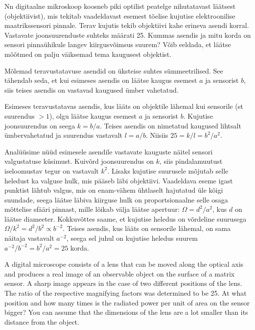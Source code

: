 
Nn digitaalne mikroskoop koosneb piki optilist peatelge nihutatavast
läätsest (objektiivist), mis tekitab vaadeldavast esemest tõelise kujutise
elektroonilise maatrikssensori pinnale. Terav kujutis tekib objektiivi kahe
erineva asendi korral. Vastavate joonsuurenduste suhteks määrati 25. Kummas
asendis ja mitu korda on sensori pinnaühikule langev kiirgusvõimsus suurem?
Võib eeldada, et läätse mõõtmed on palju väiksemad tema kaugusest objektist.

\hint
Mõlemad teravustatavuse asendid on üksteise suhtes sümmeetrilised. See tähendab seda, et kui esimeses asendis on läätse kaugus esemest $a$ ja sensorist $b$, siis teises asendis on vastavad kaugused ümber vahetatud.

\solu
Esimeses teravustatavas asendis, kus lääts on objektile lähemal kui sensorile (st suurendus $>1$), olgu läätse kaugus esemest $a$ ja sensorist $b$. Kujutise joonsuurendus on seega $k=b/a$. Teises asendis on nimetatud kaugused lihtsalt ümbervahetatud ja suurendus vastavalt $l=a/b$. Niisiis $25=k/l=b^2/a^2$.

Analüüsime nüüd esimesele asendile vastavate kauguste näitel sensori valgustatuse küsimust. Kuivõrd joonsuurendus on $k$, siis pindalamuutust iseloomustav tegur on vastavalt $k^2$. Lisaks kujutise suurusele mõjutab selle heledust ka valguse hulk, mis pääseb läbi objektiivi. Vaadeldava eseme igast punktist lähtub valgus, mis on enam-vähem ühtlaselt hajutatud üle kõigi suundade, seega läätse läbiva kiirguse hulk on proportsionaalne selle osaga mõttelise sfääri pinnast, mille lõikab välja läätse apertuur: $\Omega=d^2/a^2$, kus $d$ on läätse diameeter. Kokkuvõttes saame, et kujutise heledus on võrdeline suurusega $\Omega/k^2=d^2/b^2\propto b^{-2}$. Teises asendis, kus lääts on sensorile lähemal, on sama näitaja vastavalt $a^{-2}$, seega sel juhul on kujutise heledus suurem $a^{-2}/b^{-2}=b^2/a^2=25$ korda.

A digital microscope consists of a lens that can be moved along the optical axis and produces a real image of an observable object on the surface of a matrix sensor. A sharp image appears in the case of two different positions of the lens. The ratio of the respective magnifying factors was determined to be 25. At what position and how many times is the radiated power per unit of area on the sensor bigger? You can assume that the dimensions of the lens are a lot smaller than its distance from the object.


